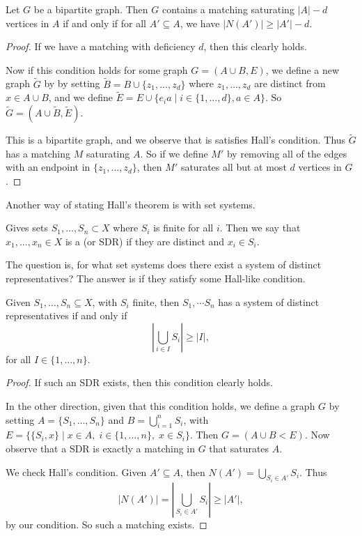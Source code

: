 \documentclass[a4paper]{scrreprt}
\begin{document}
\begin{corollary}
	Let $G$ be a bipartite graph. Then $G$ contains a matching saturating $|A|-d$ vertices in $A$ if and only if for all $A' \subseteq A$, we have $|N(A')| \geq |A'| - d$.
\end{corollary}
\begin{proof}
	If we have a matching with deficiency $d$, then this clearly holds.
	
	Now if this condition holds for some graph $G = (A\cup B, E)$, we define a new graph $\tilde{G}$ by by setting $\tilde{B} = B \cup \{z_1, \dots, z_d\}$ where $z_1, \dots, z_d$ are distinct from $x \in A \cup B$, and we define $\tilde{E} = E \cup \{e_i a \mid i \in \{1, \dots, d\}, a \in A\}$. So $\tilde{G} = (A \cup \tilde{B}, \tilde{E})$.
	
	This is a bipartite graph, and we observe that is satisfies Hall's condition. Thus $\tilde{G}$ has a matching $M$ saturating $A$. So if we define $M'$ by removing all of the edges with an endpoint in $\{z_1, \dots, z_d\}$, then $M'$ saturates all but at most $d$ vertices in $G$.
\end{proof}

Another way of stating Hall's theorem is with set systems.

\begin{definition}
Gives sets $S_1, \dots, S_n \subset X$ where $S_i$ is finite for all $i$. Then we say that $x_1, \dots, x_n \in X$ is a  (or SDR) if they are distinct and $x_i \in S_i$. 
\end{definition}

The question is, for what set systems does there exist a system of distinct representatives? The answer is if they satisfy some Hall-like condition.

\begin{corollary}
	Given $S_1, \dots, S_n \subseteq X$, with $S_i$ finite, then $S_1, \dotsm S_n$ has a system of distinct representatives if and only if
	$$
	\left|\bigcup_{i \in I} S_i\right| \geq |I|,
	 $$
	 for all $I \in \{1, \dots, n\}$.
\end{corollary}
\begin{proof}
	If such an SDR exists, then this condition clearly holds.

	In the other direction, given that this condition holds, we define a graph $G$ by setting $A = \{S_1, \dots, S_n\}$ and $B = \bigcup_{i = 1}^n S_i$, with $E = \{ \{S_i, x\} \mid x \in A,\; i \in \{1, \dots, n\}, \; x \in S_i\}$. Then $G = (A \cup B< E).$ Now observe that a SDR is exactly a matching in $G$ that saturates $A$.

	We check Hall's condition. Given $A' \subseteq A$, then $N(A') = \bigcup_{S_i \in A'} S_i$. Thus
	$$
	\left|N(A')\right| = \left|\bigcup_{S_i \in A'} S_i\right| \geq |A'|,
	$$
	by our condition. So such a matching exists.
\end{proof}
\end{document}

